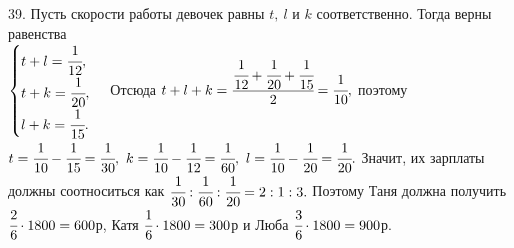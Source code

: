 39. Пусть скорости работы девочек равны $t,\ l$ и $k$ соответственно. Тогда верны равенства\\ $\begin{cases}t+l=\cfrac{1}{12},\\ t+k=\cfrac{1}{20},\\ l+k=\cfrac{1}{15}.\end{cases}$ Отсюда $t+l+k=\cfrac{\cfrac{1}{12}+\cfrac{1}{20}+\cfrac{1}{15}}{2}=\cfrac{1}{10},$ поэтому $t=\cfrac{1}{10}-\cfrac{1}{15}=\cfrac{1}{30},\ k=\cfrac{1}{10}-\cfrac{1}{12}=\cfrac{1}{60},\ l=\cfrac{1}{10}-\cfrac{1}{20}=\cfrac{1}{20}.$ Значит, их зарплаты должны соотноситься как $\cfrac{1}{30}:\cfrac{1}{60}:\cfrac{1}{20}=2:1:3.$ Поэтому Таня должна получить $\cfrac{2}{6}\cdot1800=600$р, Катя $\cfrac{1}{6}\cdot1800=300$р и Люба $\cfrac{3}{6}\cdot1800=900$р.\\
